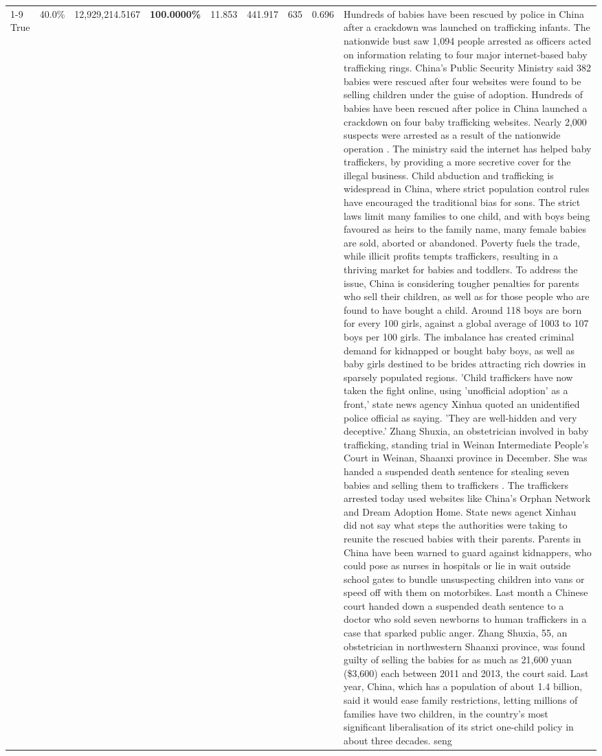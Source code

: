 \begin{table}[H]
\begin{tabular}{lllrlllll}
\cline{1-9}
True & 40.0\% & 12,929,214.5167 & \bfseries \color{red} 100.0000\% & 11.853 & 441.917 & 635 & 0.696 & Hundreds of babies have been rescued by police in China after a crackdown was launched on trafficking infants. The nationwide bust saw 1,094 people arrested as officers acted on information relating to four major internet-based baby trafficking rings. China's Public Security Ministry said 382 babies were rescued after four websites were found to be selling children under the guise of adoption. Hundreds of babies have been rescued after police in China launched a crackdown on four baby trafficking websites. Nearly 2,000 suspects were arrested as a result of the nationwide operation . The ministry said the internet has helped baby traffickers, by providing a more secretive cover for the illegal business. Child abduction and trafficking is widespread in China, where strict population control rules have encouraged the traditional bias for sons. The strict laws limit many families to one child, and with boys being favoured as heirs to the family name, many female babies are sold, aborted or abandoned. Poverty fuels the trade, while illicit profits tempts traffickers, resulting in a thriving market for babies and toddlers. To address the issue, China is considering tougher penalties for parents who sell their children, as well as for those people who are found to have bought a child. Around 118 boys are born for every 100 girls, against a global average of 1003 to 107 boys per 100 girls. The imbalance has created criminal demand for kidnapped or bought baby boys, as well as baby girls destined to be brides attracting rich dowries in sparsely populated regions. 'Child traffickers have now taken the fight online, using 'unofficial adoption' as a front,' state news agency Xinhua quoted an unidentified police official as saying. 'They are well-hidden and very deceptive.' Zhang Shuxia, an obstetrician involved in baby trafficking, standing trial in Weinan Intermediate People's Court in Weinan, Shaanxi province in December. She was handed a suspended death sentence for stealing seven babies and selling them to traffickers . The traffickers arrested today used websites like China's Orphan Network and Dream Adoption Home. State news agenct Xinhau did not say what steps the authorities were taking to reunite the rescued babies with their parents. Parents in China have been warned to guard against kidnappers, who could pose as nurses in hospitals or lie in wait outside school gates to bundle unsuspecting children into vans or speed off with them on motorbikes. Last month a Chinese court handed down a suspended death sentence to a doctor who sold seven newborns to human traffickers in a case that sparked public anger. Zhang Shuxia, 55, an obstetrician in northwestern Shaanxi province, was found guilty of selling the babies for as much as 21,600 yuan (\$3,600) each between 2011 and 2013, the court said. Last year, China, which has a population of about 1.4 billion, said it would ease family restrictions, letting millions of families have two children, in the country's most significant liberalisation of its strict one-child policy in about three decades. seng \\

\end{tabular}
\end{table}
